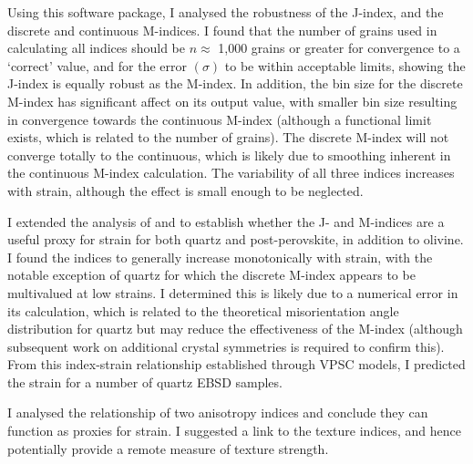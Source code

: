 \documentclass[a4paper,12pt,twoside]{report}
\numberwithin{equation}{chapter}
\begin{document}
Using this software package, I analysed the robustness of the J-index, and the discrete and continuous M-indices. I found that the number of grains used in calculating all indices should be $n \approx$ 1,000 grains or greater for convergence to a \lq{}correct\rq{} value, and for the error $(\sigma)$ to be within acceptable limits, showing the J-index is equally robust as the M-index. In addition, the bin size for the discrete M-index has significant affect on its output value, with smaller bin size resulting in convergence towards the continuous M-index (although a functional limit exists, which is related to the number of grains). The discrete M-index will not converge totally to the continuous, which is likely due to smoothing inherent in the continuous M-index calculation. The variability of all three indices increases with strain, although the effect is small enough to be neglected.

I extended the analysis of \cite{Skemer} and \cite{Mainprice} to establish whether the J- and M-indices are a useful proxy for strain for both quartz and post-perovskite, in addition to olivine. I found the indices to generally increase monotonically with strain, with the notable exception of quartz for which the discrete M-index appears to be multivalued at low strains. I determined this is likely due to a numerical error in its calculation, which is related to the theoretical misorientation angle distribution for quartz but may reduce the effectiveness of the M-index (although subsequent work on additional crystal symmetries is required to confirm this). From this index-strain relationship established through VPSC models, I predicted the strain for a number of quartz EBSD samples. 

I analysed the relationship of two anisotropy indices and conclude they can function as proxies for strain. I suggested a link to the texture indices, and hence potentially provide a remote measure of texture strength.






\newpage
\appendix
\renewcommand{\thesection}{\Roman{section}}
\end{document}
